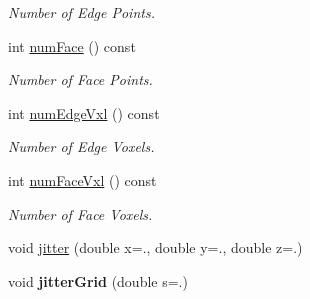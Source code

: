 \begin{DoxyCompactItemize}
\begin{DoxyCompactList}\small\item\em Number of Edge Points. \end{DoxyCompactList}\item 
\hypertarget{classvsr_1_1_lattice_ad780ecb17d0530ad4dcf8ed58456d8d3}{int \hyperlink{classvsr_1_1_lattice_ad780ecb17d0530ad4dcf8ed58456d8d3}{num\-Face} () const }\label{classvsr_1_1_lattice_ad780ecb17d0530ad4dcf8ed58456d8d3}

\begin{DoxyCompactList}\small\item\em Number of Face Points. \end{DoxyCompactList}\item 
\hypertarget{classvsr_1_1_lattice_a6a006a6b6416422ec60e990c612b2a26}{int \hyperlink{classvsr_1_1_lattice_a6a006a6b6416422ec60e990c612b2a26}{num\-Edge\-Vxl} () const }\label{classvsr_1_1_lattice_a6a006a6b6416422ec60e990c612b2a26}

\begin{DoxyCompactList}\small\item\em Number of Edge Voxels. \end{DoxyCompactList}\item 
\hypertarget{classvsr_1_1_lattice_a0acb38530b802d47473972485e44fc7f}{int \hyperlink{classvsr_1_1_lattice_a0acb38530b802d47473972485e44fc7f}{num\-Face\-Vxl} () const }\label{classvsr_1_1_lattice_a0acb38530b802d47473972485e44fc7f}

\begin{DoxyCompactList}\small\item\em Number of Face Voxels. \end{DoxyCompactList}\item 
void \hyperlink{classvsr_1_1_lattice_af67b43f155bea5130535616a67d00f8d}{jitter} (double x=., double y=., double z=.)
\item 
\hypertarget{classvsr_1_1_lattice_a09111a3397a0092af53db035f232901c}{void {\bfseries jitter\-Grid} (double s=.)}\label{classvsr_1_1_lattice_a09111a3397a0092af53db035f232901c}


\end{DoxyCompactItemize}
